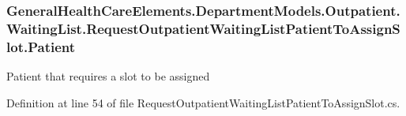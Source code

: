 \subsubsection[{\texorpdfstring{Patient}{Patient}}]{ General\+Health\+Care\+Elements.\+Department\+Models.\+Outpatient.\+Waiting\+List.\+Request\+Outpatient\+Waiting\+List\+Patient\+To\+Assign\+Slot.\+Patient\hspace{0.3cm}{\ttfamily [get]}}\hypertarget{class_general_health_care_elements_1_1_department_models_1_1_outpatient_1_1_waiting_list_1_1_reqf0cf500ea28fd461b6ca502bac291525_a7a60c89776bb32a030da807978dfc6e1}{}\label{class_general_health_care_elements_1_1_department_models_1_1_outpatient_1_1_waiting_list_1_1_reqf0cf500ea28fd461b6ca502bac291525_a7a60c89776bb32a030da807978dfc6e1}


Patient that requires a slot to be assigned 



Definition at line 54 of file Request\+Outpatient\+Waiting\+List\+Patient\+To\+Assign\+Slot.\+cs.

